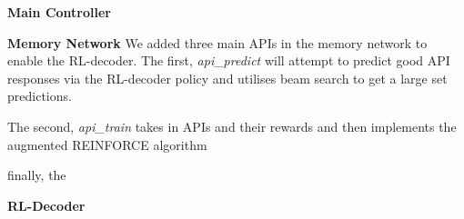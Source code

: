 \noindent\textbf{Main Controller}

\noindent\textbf{Memory Network}
We added three main APIs in the memory network to enable the RL-decoder. The first, \emph{api\_predict} will attempt to predict good API responses via the RL-decoder policy and utilises beam search to get a large set predictions.

The second, \emph{api\_train} takes in APIs and their rewards and then implements the augmented REINFORCE algorithm

finally, the 

\noindent\textbf{RL-Decoder}

